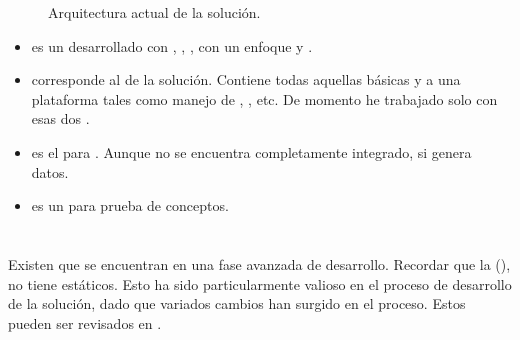 \begin{figure}[H]
	\centering
	
	
	\caption{Arquitectura actual de la solución.}
	\label{cap:avances:current_architecture}
\end{figure}
	\begin{itemize}
		\item
			\textbf{\rtcom} es un \frameworkPC \ecommerceCOM desarrollado con \meteorNAME, \nodejsNAME, \mongodbNAME, \coffeescript con un enfoque \reactive y \realTimeINT.
		\item
			\textbf{\rtcomCorePCKG} corresponde al \coreAS de la solución. Contiene todas aquellas \featuresCPT básicas y \templatesAS a una plataforma \ecommerceCOM tales como manejo de \itemsCOM, \sessionsINT, etc. De momento he trabajado solo con esas dos \featuresCPT.
		\item
			\textbf{\rtcomGoogleanalPCKG} es el \moduleAS para \googleanalytics. Aunque no se encuentra completamente integrado, si genera datos.
		\item
			\textbf{\helloworldPCKG} es un \moduleAS para prueba de conceptos.
	\end{itemize}

\section{\dataModelAS}

Existen \dataModelsAS que se encuentran en una fase avanzada de desarrollo. Recordar que la \dataBaseDB (\mongodbNAME), no tiene \schemasDB estáticos. Esto ha sido particularmente valioso en el proceso de desarrollo de la solución, dado que variados cambios han surgido en el proceso. Estos \dataModelsAS pueden ser revisados en .

